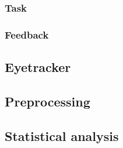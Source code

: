 \subsubsection{Task}
\label{sec:task}



\subsubsection{Feedback}
\label{sec:feedback}




\subsection{Eyetracker}


\subsection{Preprocessing}


\subsection{Statistical analysis}

